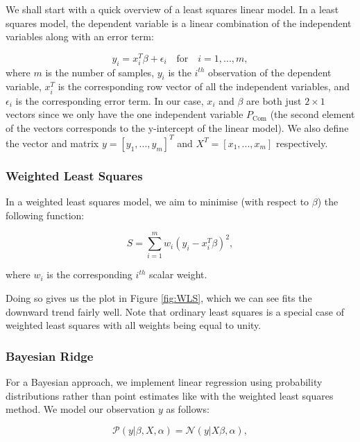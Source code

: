 \documentclass[11pt]{article}
\begin{document}
We shall start with a quick overview of a least squares linear model. In a least squares model, the dependent variable is a linear combination of the independent variables along with an error term:

\begin{equation}
	\label{eq:LS}
    y_{i}=x^{T}_{i}\beta + \epsilon_{i} \quad \textrm{for} \quad i=1,...,m,
\end{equation}
where $m$ is the number of samples, $y_{i}$ is the $i^{th}$ observation of the dependent variable, $x^{T}_{i}$ is the corresponding row vector of all the independent variables, and $\epsilon_{i}$ is the corresponding error term. In our case, $x_{i}$ and $\beta$ are both just $2\times1$ vectors since we only have the one independent variable $P_{\text{Com}}$ (the second element of the vectors corresponds to the y-intercept of the linear model). We also define the vector and matrix $y = [y_{1},...,y_{m}]^{T}$ and $X^{T} = [x_{1},...,x_{m}]$ respectively.


\subsubsection*{Weighted Least Squares}

In a weighted least squares model, we aim to minimise (with respect to $\beta$) the following function:

\begin{equation}
	\label{eq:WLS}
    S=\sum^{m}_{i=1} w_{i}(y_{i}-x^{T}_{i}\beta)^{2},
\end{equation}

where $w_{i}$ is the corresponding $i^{th}$ scalar weight.

Doing so gives us the plot in Figure \ref{fig:WLS}, which we can see fits the downward trend fairly well. Note that ordinary least squares is a special case of weighted least squares with all weights being equal to unity.

\subsubsection*{Bayesian Ridge}
For a Bayesian approach, we implement linear regression using probability distributions rather than point estimates like with the weighted least squares method. We model our observation $y$ as follows:

\begin{equation}
	\label{eq:likelihood}
    \mathcal{P}(y | \beta, X, \alpha) = \mathcal{N}(y | X\beta, \alpha),
\end{equation}
\end{document}
